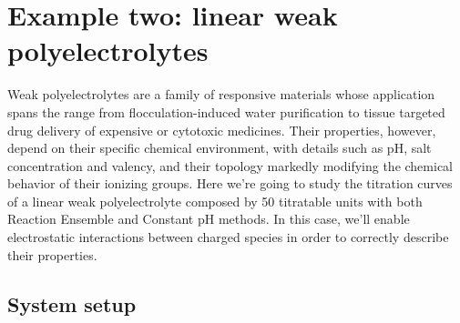 \documentclass[
a4paper,                        %
11pt,                           %
twoside,                        %
footsepline,                    %
headsepline,                    %
headexclude,                    %
footexclude,                    %
pagesize,                       %
]{scrartcl}
\begin{document}
\section{Example two: linear weak polyelectrolytes}
Weak polyelectrolytes are a family of responsive materials whose application spans the range from flocculation-induced water purification to tissue targeted drug delivery of expensive or cytotoxic medicines. Their properties, however, depend on their specific chemical environment, with details such as pH, salt concentration and valency, and their topology markedly modifying the chemical behavior of their ionizing groups.
Here we're going to study the titration curves of a linear weak polyelectrolyte composed by 50 titratable units with both Reaction Ensemble and Constant pH methods. In this case, we'll enable electrostatic interactions between charged species in order to correctly describe their properties.

\subsection{System setup}
\end{document}
